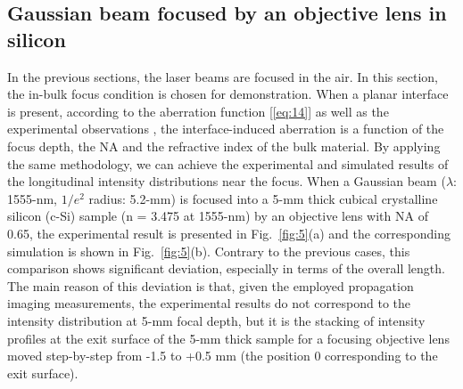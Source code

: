 \documentclass[9pt,twocolumn,twoside]{osajnl}
\begin{document}
\subsection{Gaussian beam focused by an objective lens in silicon}
In the previous sections, the laser beams are focused in the air. In this section, the in-bulk focus condition is chosen for demonstration. When a planar interface is present, according to the aberration function [\eqref{eq:14}] as well as the experimental observations \cite{li2016quantitative}, the interface-induced aberration is a function of the focus depth, the NA and the refractive index of the bulk material. By applying the same methodology, we can achieve the experimental and simulated results of the longitudinal intensity distributions near the focus. When a Gaussian beam ($\lambda$: 1555-nm, $1/e^2$ radius: 5.2-mm) is focused into a 5-mm thick cubical crystalline silicon (c-Si) sample (n = 3.475 at 1555-nm) by an objective lens with NA of 0.65, the experimental result is presented in Fig.~\ref{fig:5}(a) and the corresponding simulation is shown in Fig.~\ref{fig:5}(b). Contrary to the previous cases, this comparison shows significant deviation, especially in terms of the overall length. The main reason of this deviation is that, given the employed propagation imaging measurements, the experimental results do not correspond to the intensity distribution at 5-mm focal depth, but it is the stacking of intensity profiles at the exit surface of the 5-mm thick sample for a focusing objective lens moved step-by-step from -1.5 to +0.5 mm (the position 0 corresponding to the exit surface). %
\end{document}
